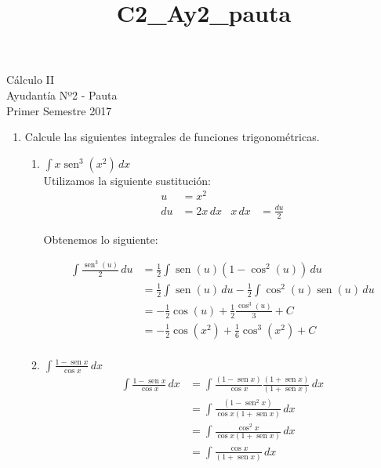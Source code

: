 \documentclass[a4paper,10pt]{article}
\title{C2_Ay2_pauta}
\newcommand{\dis}{\displaystyle}
\def\sin{\operatorname{sen}}
\begin{document}
\begin{center}
Cálculo II\\
Ayudantía Nº2 - Pauta\\
Primer Semestre 2017
\end{center}


\begin{enumerate}


\item Calcule las siguientes integrales de funciones
trigonom\'{e}tricas.
\begin{enumerate}[label=\emph{\alph*)}]
\item $\dis \int x\sin^3(x^2)\, dx$\\

Utilizamos la siguiente sustitución:
\begin{align*}
 u  &=  x^2  &    \\
 du &= 2x  \, dx     &   x \, dx &= \frac{du}{2}
\end{align*}
\dotfill [1 punto]


Obtenemos lo siguiente:



\begin{align*}
 \int \frac{\sin^3(u)}{2} \, du  &=  \frac{1}{2} \int \sin(u)(1-\cos^2(u)) \, du\\
							     &=  \frac{1}{2} \int \sin(u) \, du - \frac{1}{2} \int \cos^2(u)\sin(u) \, du  \\
                                 &=  - \frac{1}{2}  \cos(u)  + \frac{1}{2} \frac{\cos^3(u)}{3} + C   \\
                                 &=  - \frac{1}{2}  \cos(x^2)  + \frac{1}{6} \cos^3(x^2) + C   \\
\end{align*}
\dotfill [1 punto]

\newpage
\item $\dis \int \frac{1-\sin x}{\cos x}\, dx$\\



\begin{align*}
 \dis \int \frac{1-\sin x}{\cos x}\, dx  &=    \int \frac{(1-\sin x)}{\cos x}\frac{(1+\sin x)}{(1+\sin x)}  \, dx\\
 										 &=    \int \frac{(1-\sin^2 x)}{\cos x(1+\sin x)}  \, dx\\
                                         &=    \int \frac{\cos^2 x}{\cos x(1+\sin x)}  \, dx\\
                                         &=    \int \frac{\cos x}{(1+\sin x)}  \, dx\\
\end{align*}



\end{enumerate}
\end{enumerate}
\end{document}
